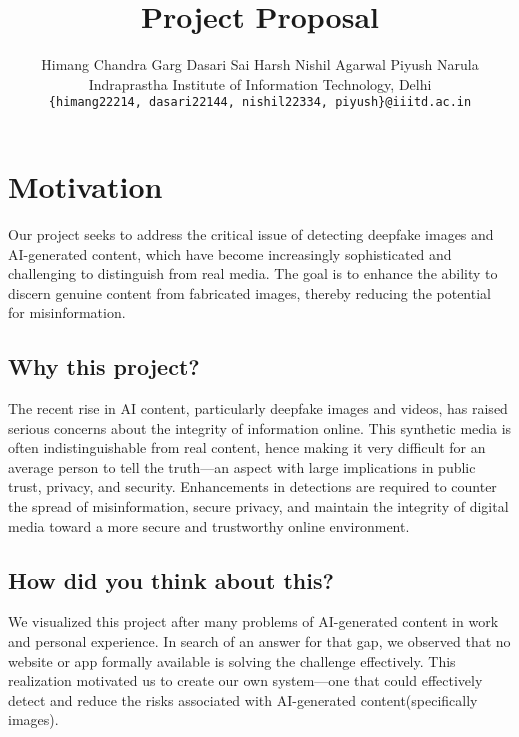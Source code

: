 \documentclass[10pt,twocolumn,letterpaper]{article}
\begin{document}
\title{Project Proposal}

\author{Himang Chandra Garg \qquad Dasari Sai Harsh \qquad Nishil Agarwal \qquad Piyush Narula\\
Indraprastha Institute of Information Technology, Delhi\\
{\tt\small \{himang22214, dasari22144, nishil22334, piyush\}@iiitd.ac.in}
}

\maketitle

\section{Motivation}

Our project seeks to address the critical issue of detecting deepfake images and AI-generated content, which have become increasingly sophisticated and challenging to distinguish from real media. 
The goal is to enhance the ability to discern genuine content from fabricated images, thereby reducing the potential for misinformation.

\subsection{Why this project?}

The recent rise in AI content, particularly deepfake images and videos, has raised serious concerns about the integrity of information online. 
This synthetic media is often indistinguishable from real content, hence making it very difficult for an average person to tell the truth—an aspect with large implications in public trust, privacy, and security.
Enhancements in detections are required to counter the spread of misinformation, secure privacy, and maintain the integrity of digital media toward a more secure and trustworthy online environment.

\subsection{How did you think about this?}

We visualized this project after many problems of AI-generated content in work and personal experience. 
In search of an answer for that gap, we observed that no website or app formally available is solving the challenge effectively. 
This realization motivated us to create our own system—one that could effectively detect and reduce the risks associated with AI-generated content(specifically images).
\end{document}
